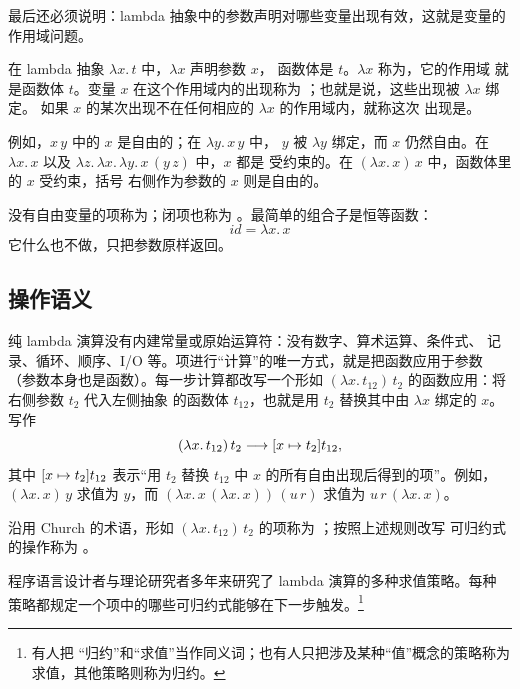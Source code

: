 最后还必须说明：lambda 抽象中的参数声明对哪些变量出现有效，这就是变量的
作用域问题。

在 lambda 抽象 \(\lambda x.\,t\) 中，\(\lambda x\) 声明参数 \(x\)，
函数体是 \(t\)。\(\lambda x\) 称为，它的作用域
就是函数体 \(t\)。变量 \(x\) 在这个作用域内的出现称为
；也就是说，这些出现被 \(\lambda x\) 绑定。
如果 \(x\) 的某次出现不在任何相应的 \(\lambda x\) 的作用域内，就称这次
出现是。

例如，\(x\,y\) 中的 \(x\) 是自由的；在 \(\lambda y.\,x\,y\) 中，
\(y\) 被 \(\lambda y\) 绑定，而 \(x\) 仍然自由。在 \(\lambda x.\,x\)
以及 \(\lambda z.\,\lambda x.\,\lambda y.\,x\,(y\,z)\) 中，\(x\) 都是
受约束的。在 \((\lambda x.\,x)\,x\) 中，函数体里的 \(x\) 受约束，括号
右侧作为参数的 \(x\) 则是自由的。

没有自由变量的项称为；闭项也称为
。最简单的组合子是恒等函数：
\[
 \mathit{id}=\lambda x.\,x
\]
它什么也不做，只把参数原样返回。

\subsection*{操作语义}

纯 lambda 演算没有内建常量或原始运算符：没有数字、算术运算、条件式、
记录、循环、顺序、I/O 等。项进行“计算”的唯一方式，就是把函数应用于参数
（参数本身也是函数）。每一步计算都改写一个形如
\((\lambda x.\,t_{12})\,t_2\) 的函数应用：将右侧参数 \(t_2\) 代入左侧抽象
的函数体 \(t_{12}\)，也就是用 \(t_2\) 替换其中由 \(\lambda x\) 绑定的
\(x\)。写作
\[
  (\lambda x.\,t_{12})\,t_2
  \mathrel{\longrightarrow}
  [x\mapsto t_2]t_{12},
\]
其中 \([x\mapsto t_2]t_{12}\) 表示“用 \(t_2\) 替换 \(t_{12}\) 中
\(x\) 的所有自由出现后得到的项”。例如，
\((\lambda x.\,x)\,y\) 求值为 \(y\)，而
\((\lambda x.\,x\,(\lambda x.\,x))\,(u\,r)\) 求值为
\(u\,r\,(\lambda x.\,x)\)。


沿用 Church 的术语，形如
\((\lambda x.\,t_{12})\,t_2\) 的项称为
；按照上述规则改写
可归约式的操作称为 。

程序语言设计者与理论研究者多年来研究了 lambda 演算的多种求值策略。每种
策略都规定一个项中的哪些可归约式能够在下一步触发。\footnote{有人把
“归约”和“求值”当作同义词；也有人只把涉及某种“值”概念的策略称为
求值，其他策略则称为归约。}

